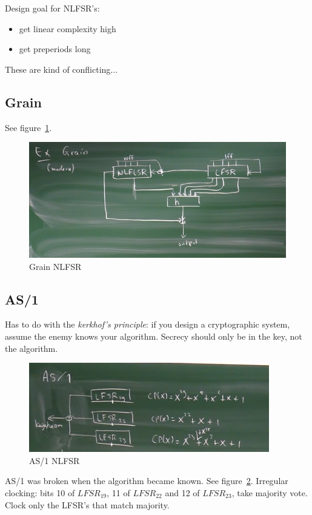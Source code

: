 \documentclass[language=english,number=]{homework}
\begin{document}
Design goal for NLFSR's:
\begin{itemize}
\item get linear complexity high
\item get preperiods long
\end{itemize}
These are kind of conflicting...

\subsection{Grain}
See figure~\ref{grain}.

\begin{figure}[h!]
\centering
\includegraphics[width=\textwidth]{grain.PNG}
\caption{Grain NLFSR}
\label{grain}
\end{figure}

\subsection{AS/1}
Has to do with the \emph{kerkhof's principle}: if you design a cryptographic system, assume the enemy knows your algorithm.
Secrecy should only be in the key, not the algorithm.

\begin{figure}[h!]
\centering
\includegraphics[width=\textwidth]{as1.PNG}
\caption{AS/1 NLFSR}
\label{as1}
\end{figure}

AS/1 was broken when the algorithm became known.
See figure~\ref{as1}.
Irregular clocking: bits 10 of $LFSR_{19}$, 11 of $LFSR_{22}$ and 12 of $LFSR_{23}$, take majority vote.
Clock only the LFSR's that match majority.
\end{document}
